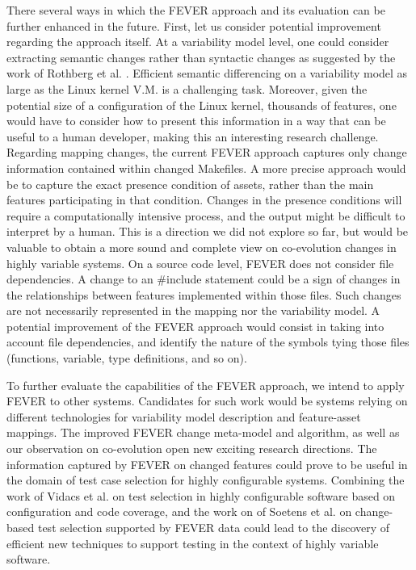 There several ways in which the FEVER approach and its evaluation can be further enhanced in the future. 
First, let us consider potential improvement regarding the approach itself.
At a variability model level, one could consider extracting semantic changes rather than
syntactic changes as suggested by the work of Rothberg et al. \citep{rothberg_feature_2016}.
Efficient semantic differencing on a variability model as large as the Linux kernel V.M. is a challenging task.
Moreover, given the potential size of a configuration of the Linux kernel, \ie thousands of features,
one would have to consider how to present this information in a way that can be useful to a human developer, 
making this an interesting research challenge.
Regarding mapping changes, the current FEVER approach captures only change information contained within 
changed Makefiles. A more precise approach would be to capture the exact presence condition of assets, 
rather than the main features participating in that condition.
Changes in the presence conditions will require a computationally intensive process, and the output 
might be difficult to interpret by a human. This is a direction we did not explore so far, 
but would be valuable to obtain a more sound and complete view on co-evolution changes in highly variable systems.
On a source code level,  FEVER does not consider file dependencies.
A change to an \#include statement could be a sign of changes in the relationships between features implemented within those files.
Such changes are not necessarily represented in the mapping nor the variability model.
A potential improvement of the FEVER approach would consist in taking into account file dependencies, 
and identify the nature of the symbols tying those files (functions, variable, type definitions, and so on).

To further evaluate the capabilities of the FEVER approach, we intend to apply FEVER to other systems.
Candidates for such work would be systems relying on different technologies for variability model 
description and feature-asset mappings.
The improved FEVER change meta-model and algorithm, as well as our observation on co-evolution open 
new exciting research directions.
The information captured by FEVER on changed features could prove to be useful in the domain of test case selection
for highly configurable systems.
Combining the work of Vidacs et al. \citep{vidacs_supporting_2015} on test selection in highly configurable software based on configuration and code coverage, and the work on of Soetens et al. \citep{soetens_change-based_2016} on change-based test selection supported by FEVER data 
could lead to the discovery of efficient new techniques to support testing in the context of highly variable software.

